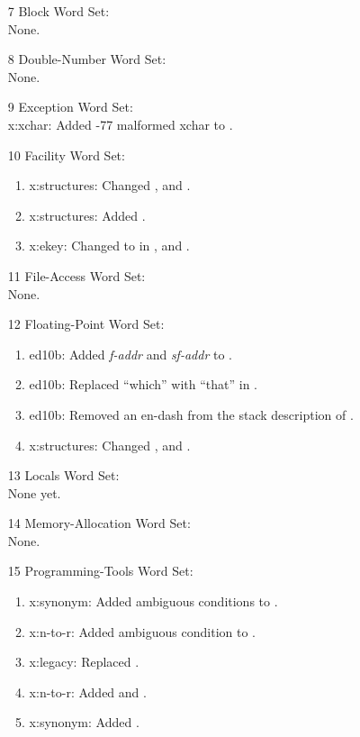 \begin{itemize}
	\item[7] Block Word Set: \\
		None.

	\item[8] Double-Number Word Set: \\
		None.

	\item[9] Exception Word Set: \\
		\textsf{x:xchar}: Added -77 malformed xchar to .

	\item[10] Facility Word Set:
		\begin{enumerate}
		\item \textsf{x:structures}: Changed ,
			and .
		\item \textsf{x:structures}: Added .
		\item \textsf{x:ekey}: Changed  to  in
			,
			 and \linebreak
			.
		\end{enumerate}

	\item[11] File-Access Word Set: \\
		None.

	\item[12] Floating-Point Word Set:
		\begin{enumerate}
		\item \textsf{ed10b}: Added \emph{f-addr} and \emph{sf-addr} to
			.
		\item \textsf{ed10b}: Replaced ``which'' with ``that'' in
			.
		\item \textsf{ed10b}: Removed an en-dash from the stack description of
			.
		\item \textsf{x:structures}: Changed ,
			 and
			.
		\end{enumerate}

	\item[13] Locals Word Set: \\
		None yet.

	\item[14] Memory-Allocation Word Set: \\
		None.

	\item[15] Programming-Tools Word Set:
		\begin{enumerate}
		\item \textsf{x:synonym}: Added ambiguous conditions to .
		\item \textsf{x:n-to-r}: Added ambiguous condition to .
		\item \textsf{x:legacy}: Replaced .
		\item \textsf{x:n-to-r}: Added  and .
		\item \textsf{x:synonym}: Added .
		\end{enumerate}


\end{itemize}
